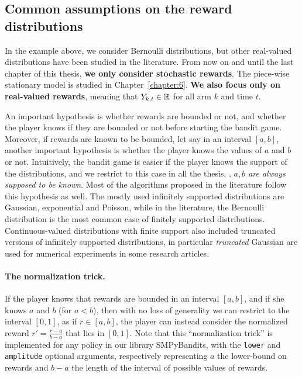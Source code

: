 \subsection{Common assumptions on the reward distributions}

In the example above, we consider Bernoulli distributions, but other real-valued distributions have been studied in the literature.
From now on and until the last chapter of this thesis, \textbf{we only consider stochastic rewards}. The piece-wise stationary model is studied in Chapter~\ref{chapter:6}.
%
\textbf{We also focus only on real-valued rewards}, meaning that $Y_{k,t}\in\mathbb{R}$ for all arm $k$ and time $t$.

An important hypothesis is whether rewards are bounded or not,
and whether the player knows if they are bounded or not before starting the bandit game.
Moreover, if rewards are known to be bounded, let say in an interval $[a,b]$, another important hypothesis is whether the player knows the values of $a$ and $b$ or not.
%
Intuitively, the bandit game is easier if the player knows the support of the distributions, and we restrict to this case in all the thesis, \ie, \emph{$a,b$ are always supposed to be known}.
Most of the algorithms proposed in the literature follow this hypothesis as well.
%
The mostly used
infinitely supported distributions are Gaussian, exponential and Poisson,
while in the literature, the Bernoulli distribution is the most common case of finitely supported distributions.
Continuous-valued distributions with finite support also included truncated versions of infinitely supported distributions, in particular \emph{truncated} Gaussian are used for numerical experiments in some research articles.

\paragraph{The normalization trick.}
\label{par:2:normalizationTrick}
%
If the player knows that rewards are bounded in an interval $[a,b]$, and if she knows $a$ and $b$ (for $a<b$), then with no loss of generality we can restrict to the interval $[0,1]$, as if $r\in[a,b]$, the player can instead consider the normalized reward $r' = \frac{r-a}{b-a}$ that lies in $[0,1]$.
Note that this ``normalization trick'' is implemented for any policy in our library SMPyBandits, with the \texttt{lower} and \texttt{amplitude} optional arguments, respectively representing $a$ the lower-bound on rewards and $b-a$ the length of the interval of possible values of rewards.


